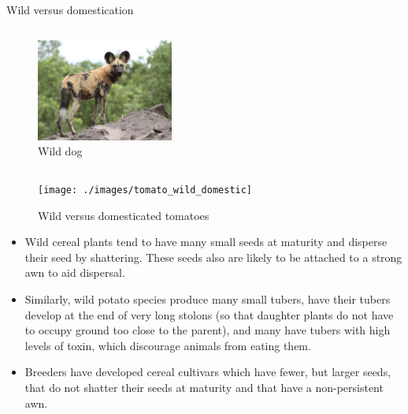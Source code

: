 \documentclass[11pt,ignorenonframetext,aspectratio=169]{beamer}
\begin{document}
\begin{frame}{Wild versus domestication}
\begin{columns}[T,onlytextwidth]
\begin{figure}
\includegraphics[width=0.4\textwidth, keepaspectratio]{./images/wild_dog_african} \caption{Wild dog}\label{fig:wild}
\end{figure}

\end{columns}
\end{frame}

\begin{frame}{}
\protect\hypertarget{section-1}{}
\begin{figure}
\texttt{[image: ./images/tomato\_wild\_domestic]} \caption{Wild versus domesticated tomatoes}\label{fig:wild-vs-domesticated-tomato}
\end{figure}
\end{frame}

\begin{frame}{}
\protect\hypertarget{section-2}{}
\begin{itemize}
\item
  Wild cereal plants tend to have many small seeds at maturity and
  disperse their seed by shattering. These seeds also are likely to be
  attached to a strong awn to aid dispersal.
\item
  Similarly, wild potato species produce many small tubers, have their
  tubers develop at the end of very long stolons (so that daughter
  plants do not have to occupy ground too close to the parent), and many
  have tubers with high levels of toxin, which discourage animals from
  eating them.
\item
  Breeders have developed cereal cultivars which have fewer, but larger
  seeds, that do not shatter their seeds at maturity and that have a
  non-persistent awn.
\end{itemize}
\end{frame}
\end{document}

